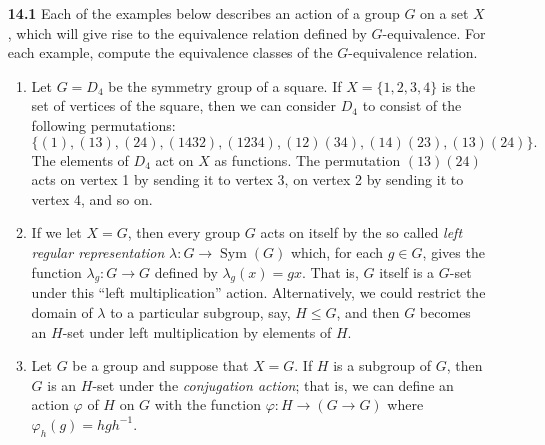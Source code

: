 \documentclass[12pt,reqno]{amsart}
\newcommand{\<}{\ensuremath{\langle}}
\renewcommand{\>}{\ensuremath{\rangle}}
\newcommand{\Sym}{\ensuremath{\operatorname{Sym}}}
\begin{document}
\begin{enumerate}
\item[{\bf 14.1}] Each of the examples below describes an action of a group $G$
  on a set $X$, which will give rise to the equivalence relation defined by
  $G$-equivalence.  For each example, compute the equivalence classes of the
  $G$-equivalence relation.  
 
\begin{enumerate}
\item
Let $G = D_4$ be the symmetry group of a square.  If $X = \{ 1, 2, 3, 4 \}$ is the set of vertices of the square, then we can consider $D_4$
to consist of the following permutations: 
\[\{ (1), (13), (24), (1432), (1234), (12)(34), (14)(23), (13)(24) \}.\]
The elements of $D_4$ act on $X$ as functions.  The permutation $(13)(24)$ acts on vertex 1 by sending it to vertex 3, on vertex 2 by
sending it to vertex 4, and so on.

\smallskip

\item 
If we let $X = G$, then every group $G$ acts on itself by the so called 
\emph{left regular representation} $\lambda: G \rightarrow \Sym(G)$ which, for
each $g\in G$, gives the function $\lambda_g: G\rightarrow G$ 
defined by $\lambda_g(x) = gx$. That is, $G$
itself is a $G$-set under this ``left multiplication'' action.
Alternatively, we could restrict the domain of $\lambda$ to a particular
subgroup, say, $H\leq G$, and then $G$ becomes an $H$-set under left 
multiplication by elements of $H$. 
 
\smallskip 

 
\item
Let $G$ be a group and suppose that $X=G$. If $H$ is a subgroup of
$G$, then $G$ is an $H$-set under 
the \emph{conjugation action}; that is, we can define an action 
$\varphi$ of $H$ on $G$ with the function 
$\varphi: H \rightarrow (G \rightarrow G)$ where 
$\varphi_h(g) = hgh^{-1}$.
 

\end{enumerate}
\end{enumerate}
\end{document}
